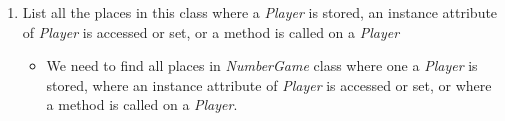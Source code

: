\documentclass[12pt]{article}
\begin{document}
\begin{enumerate}[1.]
\begin{itemize}











    \end{itemize}

    \item List all the places in this class where a \textit{Player} is stored, an instance
    attribute of \textit{Player} is accessed or set, or a method is called on a \textit{Player}

    \begin{itemize}
        \item  We need to find all places in \textit{NumberGame} class where one a
        \textit{Player} is stored, where an instance attribute of \textit{Player}
        is accessed or set, or where a method is called on a \textit{Player}.


\end{itemize}
\end{enumerate}
\end{document}
